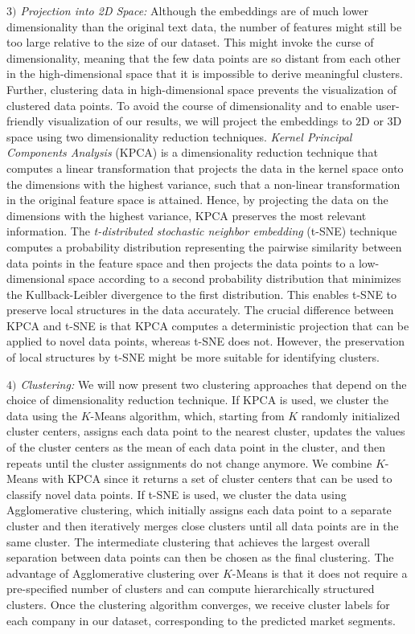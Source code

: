 \documentclass[conference]{IEEEtran}
\begin{document}
\textit{$3)$ Projection into 2D Space:} Although the embeddings are of much lower dimensionality than the original text data, the number of features might still be too large relative to the size of our dataset. This might invoke the curse of dimensionality, meaning that the few data points are so distant from each other in the high-dimensional space that it is impossible to derive meaningful clusters. Further, clustering data in high-dimensional space prevents the visualization of clustered data points. To avoid the course of dimensionality and to enable user-friendly visualization of our results, we will project the embeddings to 2D or 3D space using two dimensionality reduction techniques.
\emph{Kernel Principal Components Analysis} (KPCA) is a dimensionality reduction technique that computes a linear transformation that projects the data in the kernel space onto the dimensions with the highest variance, such that a non-linear transformation in the original feature space is attained. Hence, by projecting the data on the dimensions with the highest variance, KPCA preserves the most relevant information.
The \emph{t-distributed stochastic neighbor embedding} (t-SNE) technique computes a probability distribution representing the pairwise similarity between data points in the feature space and then projects the data points to a low-dimensional space according to a second probability distribution that minimizes the Kullback-Leibler divergence to the first distribution. This enables t-SNE to preserve local structures in the data accurately.
The crucial difference between KPCA and t-SNE is that KPCA computes a deterministic projection that can be applied to novel data points, whereas t-SNE does not. However, the preservation of local structures by t-SNE might be more suitable for identifying clusters.

\textit{$4)$ Clustering:} We will now present two clustering approaches that depend on the choice of dimensionality reduction technique.
If KPCA is used, we cluster the data using the $K$-Means algorithm, which, starting from $K$ randomly initialized cluster centers, assigns each data point to the nearest cluster, updates the values of the cluster centers as the mean of each data point in the cluster, and then repeats until the cluster assignments do not change anymore. We combine $K$-Means with KPCA since it returns a set of cluster centers that can be used to classify novel data points. 
If t-SNE is used, we cluster the data using Agglomerative clustering, which initially assigns each data point to a separate cluster and then iteratively merges close clusters until all data points are in the same cluster. The intermediate clustering that achieves the largest overall separation between data points can then be chosen as the final clustering. The advantage of Agglomerative clustering over $K$-Means is that it does not require a pre-specified number of clusters and can compute hierarchically structured clusters.
Once the clustering algorithm converges, we receive cluster labels for each company in our dataset, corresponding to the predicted market segments.
\end{document}
